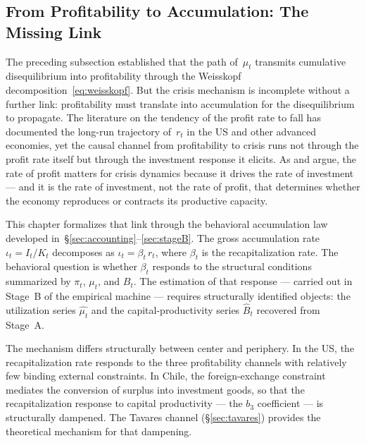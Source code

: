 \documentclass[12pt,letterpaper]{article}
\newcommand{\mut}{\mu_t}           %
\newcommand{\pit}{\pi_t}           %
\newcommand{\iotat}{\iota_t}       %
\newcommand{\betat}{\beta_t}       %
\newcommand{\Bt}{B_t}              %
\begin{document}
\subsection{From Profitability to Accumulation: The Missing Link}
\label{sec:missing_link}

The preceding subsection established that the path of~$\mut$ transmits
cumulative disequilibrium into profitability through the Weisskopf
decomposition~\eqref{eq:weisskopf}. But the crisis mechanism is incomplete
without a further link: profitability must translate into accumulation for the
disequilibrium to propagate. The literature on the tendency of the profit rate
to fall \citep{basu2012,basu2013} has documented the long-run trajectory
of~$r_t$ in the US and other advanced economies, yet the causal channel from
profitability to crisis runs not through the profit rate itself but through the
investment response it elicits. As \citet{basu2017} and
\citet{ibarra2023,ibarra2024} argue, the rate of profit matters for crisis
dynamics because it drives the rate of investment --- and it is the rate of
investment, not the rate of profit, that determines whether the economy
reproduces or contracts its productive capacity.

This chapter formalizes that link through the behavioral accumulation law
developed in~\S\ref{sec:accounting}--\ref{sec:stageB}. The gross accumulation
rate $\iotat = I_t/K_t$ decomposes as $\iotat = \betat\, r_t$, where $\betat$
is the recapitalization rate. The behavioral question is whether $\betat$
responds to the structural conditions summarized by $\pit$, $\mut$, and $\Bt$.
The estimation of that response --- carried out in Stage~B of the empirical
machine --- requires structurally identified objects: the utilization series
$\widehat{\mut}$ and the capital-productivity series $\hat{B}_t$ recovered from
Stage~A.

The mechanism differs structurally between center and periphery. In the US, the
recapitalization rate responds to the three profitability channels with
relatively few binding external constraints. In Chile, the foreign-exchange
constraint mediates the conversion of surplus into investment goods, so that the
recapitalization response to capital productivity --- the $b_3$ coefficient ---
is structurally dampened. The Tavares channel (\S\ref{sec:tavares}) provides
the theoretical mechanism for that dampening.
\end{document}
